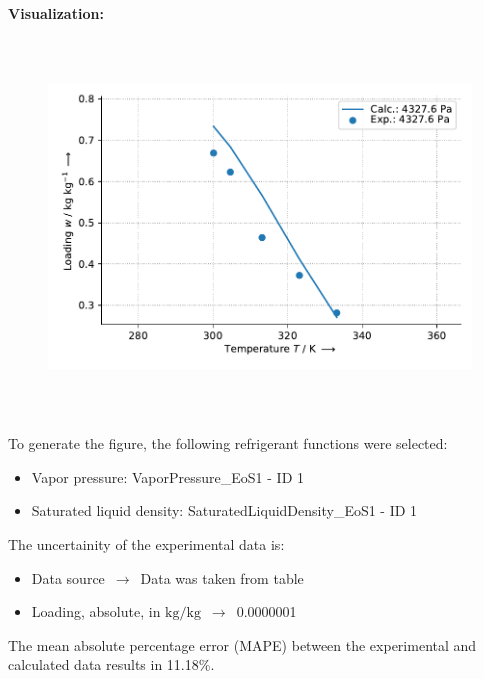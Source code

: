 \textbf{Visualization:}
%
\begin{figure}[!htp]
{\noindent\includegraphics[height=10cm, keepaspectratio]{figs/ads/ads_Ethanol_activated_carbon_fiber_A-20_DubininAstakhov_1.pdf}}
\end{figure}
%

To generate the figure, the following refrigerant functions were selected:
\begin{itemize}
\item Vapor pressure: VaporPressure\_EoS1 - ID 1
\item Saturated liquid density: SaturatedLiquidDensity\_EoS1 - ID 1
\end{itemize}

The uncertainity of the experimental data is:
\begin{itemize}
\item Data source $\,\to\,$ Data was taken from table
\item Loading, absolute, in $\si{\kilogram\per\kilogram}$ $\,\to\,$ 0.0000001
\end{itemize}

The mean absolute percentage error (MAPE) between the experimental and calculated data results in 11.18\%.
\FloatBarrier
\newpage

